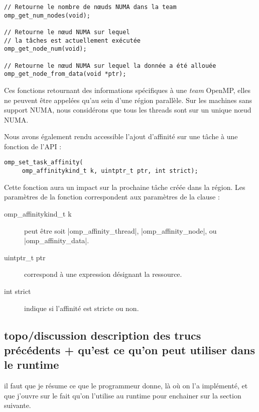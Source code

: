 \begin{lstlisting}
// Retourne le nombre de nœuds NUMA dans la team
omp_get_num_nodes(void);

// Retourne le nœud NUMA sur lequel
// la tâches est actuellement exécutée
omp_get_node_num(void);

// Retourne le nœud NUMA sur lequel la donnée a été allouée
omp_get_node_from_data(void *ptr);
\end{lstlisting}

Ces fonctions retournant des informations spécifiques à une \emph{team} OpenMP, elles ne peuvent être appelées qu'au sein d'une région parallèle.
Sur les machines sans support NUMA, nous considérons que tous les threads sont sur un unique nœud NUMA.

Nous avons également rendu accessible l'ajout d'affinité sur une tâche à une fonction de l'API :
\begin{lstlisting}
omp_set_task_affinity( 
     omp_affinitykind_t k, uintptr_t ptr, int strict);
\end{lstlisting}
Cette fonction aura un impact sur la prochaine tâche créée dans la région.
Les paramètres de la fonction correspondent aux paramètres de la clause :

\begin{description}
  \item [omp\_affinitykind\_t k] peut être soit |omp_affinity_thread|, |omp_affinity_node|, ou |omp_affinity_data|.
  \item [uintptr\_t ptr] correspond à une expression désignant la ressource.
  \item [int strict] indique si l'affinité est stricte ou non.
\end{description}


\subsection{topo/discussion description des trucs précédents + qu'est ce qu'on peut utiliser dans le runtime}

\begin{todo}
  il faut que je résume ce que le programmeur donne, là où on l'a implémenté, et que j'ouvre sur le fait qu'on l'utilise au runtime pour enchainer sur la section suivante.
\end{todo}





